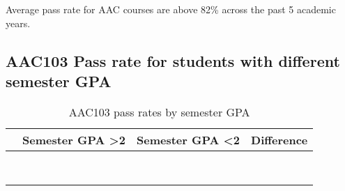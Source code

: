 \documentclass[
  letterpaper,
  DIV=11,
  numbers=noendperiod]{scrartcl}
\begin{document}
Average pass rate for AAC courses are above 82\% across the past 5
academic years.

\hypertarget{aac103-pass-rate-for-students-with-different-semester-gpa}{%
\subsection{AAC103 Pass rate for students with different semester
GPA}\label{aac103-pass-rate-for-students-with-different-semester-gpa}}

\begin{table}[!h]

\caption{AAC103 pass rates by semester GPA}
\centering
\fontsize{12}{14}\selectfont
\begin{tabular}[t]{>{\centering\arraybackslash}p{7em}>{\centering\arraybackslash}p{4em}>{\centering\arraybackslash}p{4em}>{\centering\arraybackslash}p{4em}}
\toprule
 & Semester GPA >2 & Semester GPA <2 & Difference\\
\midrule
\cellcolor{white}{\textcolor{black}{\cellcolor{gray!6}{2018 Fall}}} & \cellcolor{white}{\textcolor{black}{\cellcolor{gray!6}{76\%}}} & \cellcolor{white}{\textcolor{black}{\cellcolor{gray!6}{67\%}}} & \cellcolor{white}{\cellcolor{gray!6}{9\%}}\\
\cellcolor{white}{\textcolor{black}{2019 Fall}} & \cellcolor[HTML]{ffe099}{\textcolor{black}{86\%}} & \cellcolor{white}{\textcolor{black}{73\%}} & \cellcolor{white}{13\%}\\
\cellcolor{white}{\textcolor{black}{\cellcolor{gray!6}{2019 Spring}}} & \cellcolor[HTML]{ffe099}{\textcolor{black}{\cellcolor{gray!6}{87\%}}} & \cellcolor{white}{\textcolor{black}{\cellcolor{gray!6}{75\%}}} & \cellcolor{white}{\cellcolor{gray!6}{12\%}}\\
\cellcolor{white}{\textcolor{black}{2020 Fall}} & \cellcolor[HTML]{ffe099}{\textcolor{black}{88\%}} & \cellcolor{white}{\textcolor{black}{54\%}} & \cellcolor[HTML]{aaaaaa}{34\%}\\
\cellcolor{white}{\textcolor{black}{\cellcolor{gray!6}{2020 Spring}}} & \cellcolor[HTML]{ffe099}{\textcolor{black}{\cellcolor{gray!6}{83\%}}} & \cellcolor{white}{\textcolor{black}{\cellcolor{gray!6}{74\%}}} & \cellcolor{white}{\cellcolor{gray!6}{10\%}}\\
\addlinespace
\cellcolor{white}{\textcolor{black}{2021 Fall}} & \cellcolor[HTML]{FFCB4F}{\textcolor{black}{93\%}} & \cellcolor[HTML]{FFCB4F}{\textcolor{black}{93\%}} & \cellcolor{white}{0\%}\\
\cellcolor{white}{\textcolor{black}{\cellcolor{gray!6}{2021 Spring}}} & \cellcolor[HTML]{ffe099}{\textcolor{black}{\cellcolor{gray!6}{89\%}}} & \cellcolor{white}{\textcolor{black}{\cellcolor{gray!6}{70\%}}} & \cellcolor[HTML]{cccccc}{\cellcolor{gray!6}{19\%}}\\
\cellcolor{white}{\textcolor{black}{2022 Spring}} & \cellcolor[HTML]{ffe099}{\textcolor{black}{86\%}} & \cellcolor{white}{\textcolor{black}{64\%}} & \cellcolor[HTML]{cccccc}{22\%}\\
\bottomrule
\end{tabular}
\end{table}
\end{document}
